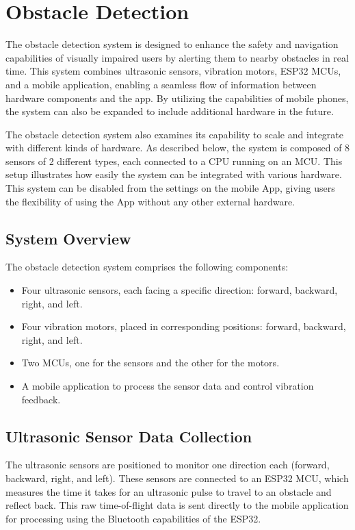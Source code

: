 \section{Obstacle Detection}
\label{Obstacle Detection Methodology Section}

The obstacle detection system is designed to enhance the safety and navigation capabilities of visually impaired users by alerting them to nearby obstacles in real time. This system combines ultrasonic sensors, vibration motors, ESP32 MCUs, and a mobile application, enabling a seamless flow of information between hardware components and the app. By utilizing the capabilities of mobile phones, the system can also be expanded to include additional hardware in the future.

The obstacle detection system also examines its capability to scale and integrate with different kinds of hardware. As described below, the system is composed of 8 sensors of 2 different types, each connected to a CPU running on an MCU. This setup illustrates how easily the system can be integrated with various hardware. This system can be disabled from the settings on the mobile App, giving users the flexibility of using the App without any other external hardware.

\subsection{System Overview}

The obstacle detection system comprises the following components:

\begin{itemize}
	\item Four ultrasonic sensors, each facing a specific direction: forward, backward, right, and left.
	\item Four vibration motors, placed in corresponding positions: forward, backward, right, and left.
	\item Two MCUs, one for the sensors and the other for the motors.
	\item A mobile application to process the sensor data and control vibration feedback.
\end{itemize}

\subsection{Ultrasonic Sensor Data Collection}

The ultrasonic sensors are positioned to monitor one direction each (forward, backward, right, and left). These sensors are connected to an ESP32 MCU, which measures the time it takes for an ultrasonic pulse to travel to an obstacle and reflect back. This raw time-of-flight data is sent directly to the mobile application for processing using the Bluetooth capabilities of the ESP32.

